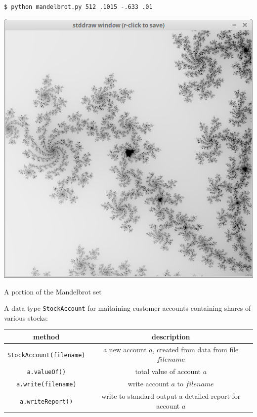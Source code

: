 \documentclass[8pt,a4paper,compress,handout]{beamer}
\begin{document}
\begin{frame}[fragile]
\begin{minipage}{200pt}
\begin{lstlisting}[language={}]
$ python mandelbrot.py 512 .1015 -.633 .01
\end{lstlisting}
\end{minipage}%
\hfill
\begin{minipage}{100pt}
\begin{center}
\includegraphics[scale=0.2]{figures/mandelbrot2.png}

\smallskip

\tiny A portion of the Mandelbrot set
\end{center}
\end{minipage}%
\end{frame}

\begin{frame}[fragile]
A data type \lstinline{StockAccount} for maitaining customer accounts containing shares of various stocks:
\begin{center}
\begin{tabular}{cc}
method & description \\ \hline
\lstinline$StockAccount(filename)$ & a new account $a$, created from data from file $filename$ \\
\lstinline$a.valueOf()$ & total value of account $a$ \\
\lstinline$a.write(filename)$ & write account $a$ to $filename$ \\
\lstinline$a.writeReport()$ & write to standard output a detailed report for account $a$
\end{tabular} 
\end{center}
\end{frame}
\end{document}
